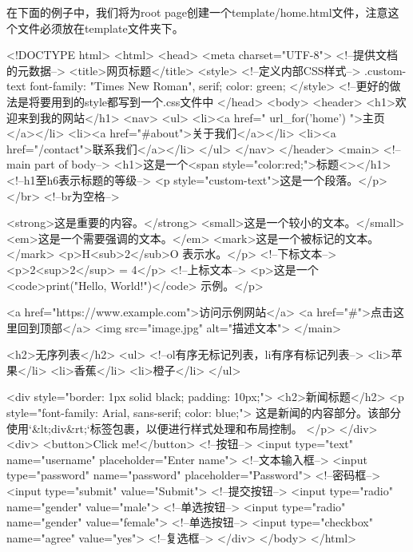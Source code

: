       在下面的例子中，我们将为root page创建一个template/home.html文件，注意这个文件必须放在template文件夹下。
      \begin{codeblock}[language=HTMLwithJinja, caption={template/home.html}]
        <!DOCTYPE html>
        <html>
        <head>
            <meta charset="UTF-8"> <!--提供文档的元数据-->
            <title>网页标题</title>
            <style> <!--定义内部CSS样式-->
                .custom-text {
                    font-family: "Times New Roman", serif;
                    color: green;
                }
            </style> <!--更好的做法是将要用到的style都写到一个.css文件中
        </head>
        <body>
            <header>
                <h1>欢迎来到我的网站</h1>
                <nav>
                    <ul>
                        <li><a href="{{ url_for('home') }}">主页</a></li>
                        <li><a href="#about">关于我们</a></li>
                        <li><a href="/contact">联系我们</a></li>
                    </ul>
                </nav>
            </header>
            <main> <!--main part of body-->
                <h1>这是一个<span style="color:red;">标题<\span></h1> <!--h1至h6表示标题的等级-->
                <p style="custom-text">这是一个段落。</p></br> <!--br为空格-->

                <strong>这是重要的内容。</strong>
                <small>这是一个较小的文本。</small>
                <em>这是一个需要强调的文本。</em>
                <mark>这是一个被标记的文本。</mark>
                <p>H<sub>2</sub>O 表示水。</p> <!--下标文本-->
                <p>2<sup>2</sup> = 4</p> <!--上标文本-->
                <p>这是一个 <code>print("Hello, World!")</code> 示例。</p>

                <a href="https://www.example.com">访问示例网站</a>
                <a href="#">点击这里回到顶部</a>
                <img src="image.jpg" alt="描述文本">
            </main>

            <h2>无序列表</h2>
            <ul> <!--ol有序无标记列表，li有序有标记列表-->
                <li>苹果</li>
                <li>香蕉</li>
                <li>橙子</li>
            </ul>

            <div style="border: 1px solid black; padding: 10px;">
                <h2>新闻标题</h2>
                <p style="font-family: Arial, sans-serif; color: blue;">
                    这是新闻的内容部分。该部分使用`&lt;div&rt;`标签包裹，以便进行样式处理和布局控制。
                </p>
            </div>
            <div>
                <button>Click me!</button> <!--按钮-->
                <input type="text" name="username" placeholder="Enter name"> <!--文本输入框-->
                <input type="password" name="password" placeholder="Password"> <!--密码框-->
                <input type="submit" value="Submit"> <!--提交按钮-->
                <input type="radio" name="gender" value="male"> <!--单选按钮-->
                <input type="radio" name="gender" value="female"> <!--单选按钮-->
                <input type="checkbox" name="agree" value="yes"> <!--复选框-->
            </div> 
        </body>
        </html>
      \end{codeblock}

